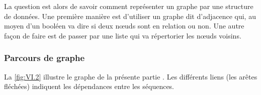 

La question est alors de savoir comment représenter un graphe par une structure de données. Une première manière est d'utiliser un graphe dit d’adjacence qui, au moyen d'un booléen va dire si deux nœuds sont en relation ou non. Une autre façon de faire est de passer par une liste qui va répertorier les nœuds voisins.

\subsubsection[Parcours de graphe]{Parcours de graphe}
\label{subsub:VI.1.2.2}

La \cref{fig:VI.2} illustre le graphe de la présente partie . Les différents liens (les arêtes fléchées) indiquent les dépendances entre les séquences.

